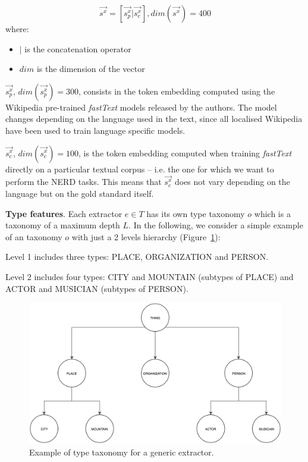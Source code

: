 \documentclass{llncs}
\newcommand{\figref}[1]{\mbox{Figure~\ref{#1}}}
\begin{document}
\begin{equation}
\vec{s^{x}} = \left [  \vec{s^{x}_p}|\vec{s^{x}_c} \right ], dim(\vec{s^{x}})=400
\end{equation}
where: 
\begin{itemize}
    \item[] $|$ is the concatenation operator
    \item[] $dim$ is the dimension of the vector
\end{itemize}

$\vec{s^{x}_p}$, $dim(\vec{s^{x}_p})=300$, consists in the token embedding computed using the Wikipedia pre-trained \textit{fastText} models released by the authors. The model changes depending on the language used in the text, since all localised Wikipedia have been used to train language specific models.

$\vec{s^{x}_c}$, $dim(\vec{s^{x}_c})=100$, is the token embedding computed when training \textit{fastText} directly on a particular textual corpus -- i.e. the one for which we want to perform the NERD tasks. This means that $\vec{s^{x}_c}$ does not vary depending on the language but on the gold standard itself.

\textbf{Type features}. Each extractor $e \in T$ has its own type taxonomy $o$ which is a taxonomy of a maximum depth $L$. In the following, we consider a simple example of an taxonomy $o$ with just a 2 levels hierarchy (\figref{fig:ontology}):
\begin{enumerate}
\begin{item}
Level 1 includes three types: PLACE, ORGANIZATION and PERSON.
\end{item}
\begin{item}
Level 2 includes four types: CITY and MOUNTAIN (subtypes of PLACE) and ACTOR and MUSICIAN (subtypes of PERSON). 
\end{item}
\end{enumerate}

\begin{figure}
	\centering
    \includegraphics[scale=0.23]{onotlogy.png}
 	\caption{Example of type taxonomy for a generic extractor.}
 	\label{fig:ontology}
\end{figure}
\end{document}
